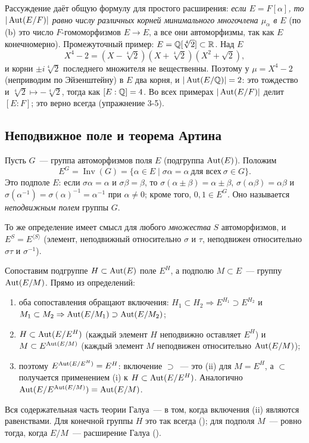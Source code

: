 \begin{remark}[3.3a]
Рассуждение  даёт общую формулу для простого расширения: \emph{если $E=F[\alpha]$, то $|\operatorname{Aut}(E/F)|$ равно числу
различных корней минимального многочлена $\mu_\alpha$ в $E$} (по (b) это число $F$-гомоморфизмов $E\to E$, а все они
автоморфизмы, так как $E$ конечномерно). Промежуточный пример: $E=\mathbb Q[\sqrt[4]2]\subset\mathbb R$. Над $E$
\[
X^4-2=(X-\sqrt[4]2)(X+\sqrt[4]2)(X^2+\sqrt2),
\]
и корни $\pm i\sqrt[4]2$ последнего множителя не вещественны. Поэтому у $\mu=X^4-2$ (неприводим по Эйзенштейну) в $E$
два корня, и $|\operatorname{Aut}(E/\mathbb Q)|=2$: это тождество и $\sqrt[4]2\mapsto-\sqrt[4]2$, тогда как $[E:\mathbb Q]=4$. Во всех примерах
$|\operatorname{Aut}(E/F)|$ делит $[E:F]$; это верно всегда (упражнение 3-5).
\end{remark}

\subsection*{Неподвижное поле и теорема Артина}

\begin{definition}[3.3b]
Пусть $G$~--- группа автоморфизмов поля $E$ (подгруппа $\operatorname{Aut}(E)$). Положим
\[
E^G=\operatorname{Inv}(G)=\{\alpha\in E\mid \sigma\alpha=\alpha\ \text{для всех}\ \sigma\in G\}.
\]
Это подполе $E$: если $\sigma\alpha=\alpha$ и $\sigma\beta=\beta$, то $\sigma(\alpha\pm\beta)=\alpha\pm\beta$,
$\sigma(\alpha\beta)=\alpha\beta$ и $\sigma(\alpha^{-1})=\sigma(\alpha)^{-1}=\alpha^{-1}$ при $\alpha\ne0$; кроме того, $0,1\in E^G$.
Оно называется \emph{неподвижным полем} группы $G$.
\end{definition}

То же определение имеет смысл для любого \emph{множества} $S$ автоморфизмов, и $E^S=E^{\langle S\rangle}$ (элемент,
неподвижный относительно $\sigma$ и $\tau$, неподвижен относительно $\sigma\tau$ и $\sigma^{-1}$).

\begin{remark}
Сопоставим подгруппе $H\subset\operatorname{Aut}(E)$ поле $E^H$, а подполю $M\subset E$~--- группу $\operatorname{Aut}(E/M)$. Прямо из определений:
\begin{enumerate}[label=\textup{(\roman*)}]
\item оба сопоставления обращают включения: $H_1\subset H_2\Rightarrow E^{H_1}\supset E^{H_2}$ и
$M_1\subset M_2\Rightarrow\operatorname{Aut}(E/M_1)\supset\operatorname{Aut}(E/M_2)$;
\item $H\subset\operatorname{Aut}(E/E^H)$ (каждый элемент $H$ неподвижно оставляет $E^H$) и $M\subset E^{\operatorname{Aut}(E/M)}$ (каждый элемент
$M$ неподвижен относительно $\operatorname{Aut}(E/M)$);
\item поэтому $E^{\operatorname{Aut}(E/E^H)}=E^H$: включение $\supset$~--- это (ii) для $M=E^H$, а $\subset$ получается применением (i) к
$H\subset\operatorname{Aut}(E/E^H)$. Аналогично $\operatorname{Aut}(E/E^{\operatorname{Aut}(E/M)})=\operatorname{Aut}(E/M)$.
\end{enumerate}
Вся содержательная часть теории Галуа~--- в том, когда включения (ii) являются равенствами. Для конечной группы $H$
это так всегда (); для подполя $M$~--- ровно тогда, когда $E/M$~--- расширение Галуа ().
\end{remark}

